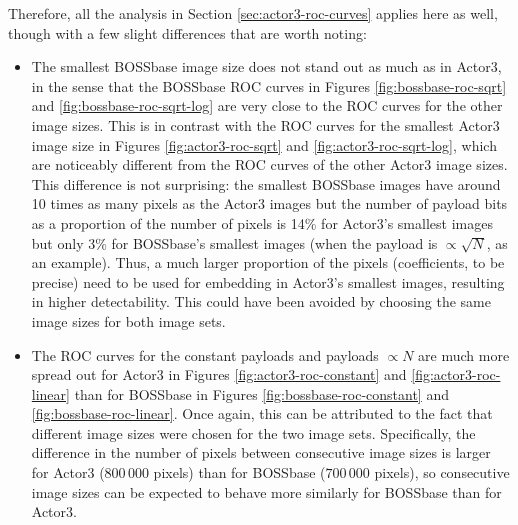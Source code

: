 \documentclass[11pt,a4paper,twoside,openright]{report}
\begin{document}
Therefore, all the analysis in Section \ref{sec:actor3-roc-curves} applies here as well, though with a few slight differences that are worth noting:
\begin{itemize}
	\item The smallest BOSSbase image size does not stand out as much as in Actor3, in the sense that the BOSSbase ROC curves in Figures \ref{fig:bossbase-roc-sqrt} and \ref{fig:bossbase-roc-sqrt-log} are very close to the ROC curves for the other image sizes. This is in contrast with the ROC curves for the smallest Actor3 image size in Figures \ref{fig:actor3-roc-sqrt} and \ref{fig:actor3-roc-sqrt-log}, which are noticeably different from the ROC curves of the other Actor3 image sizes. This difference is not surprising: the smallest BOSSbase images have around 10 times as many pixels as the Actor3 images but the number of payload bits as a proportion of the number of pixels is 14\% for Actor3's smallest images but only 3\% for BOSSbase's smallest images (when the payload is $\propto \sqrt{N}$, as an example). Thus, a much larger proportion of the pixels (coefficients, to be precise) need to be used for embedding in Actor3's smallest images, resulting in higher detectability. This could have been avoided by choosing the same image sizes for both image sets.
	\item The ROC curves for the constant payloads and payloads $\propto N$ are much more spread out for Actor3 in Figures \ref{fig:actor3-roc-constant} and \ref{fig:actor3-roc-linear} than for BOSSbase in Figures \ref{fig:bossbase-roc-constant} and \ref{fig:bossbase-roc-linear}. Once again, this can be attributed to the fact that different image sizes were chosen for the two image sets. Specifically, the difference in the number of pixels between consecutive image sizes is larger for Actor3 ($800\,000$ pixels) than for BOSSbase ($700\,000$ pixels), so consecutive image sizes can be expected to behave more similarly for BOSSbase than for Actor3.
\end{itemize}
\end{document}
